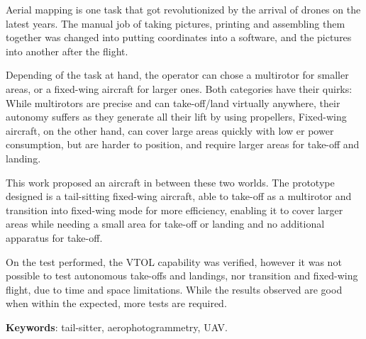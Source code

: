 \begin{resumo}[Abstract]

Aerial mapping is one task that got revolutionized by the arrival of drones on the latest years. The manual job of taking pictures, printing and assembling them together was changed into putting coordinates into a software, and the pictures into another after the flight.

Depending of the task at hand, the operator can chose a multirotor for smaller areas, or a fixed-wing aircraft for larger ones. Both categories have their quirks: While multirotors are precise and can take-off/land virtually anywhere, their autonomy suffers as they generate all their lift by using propellers, Fixed-wing aircraft, on the other hand, can cover large areas quickly with low	er power consumption, but are harder to position, and require larger areas for take-off and landing.
 
This work proposed an aircraft in between these two worlds. The prototype designed is a tail-sitting fixed-wing aircraft, able to take-off as a multirotor and transition into fixed-wing mode for more efficiency, enabling it to cover larger areas while needing a small area for take-off or landing and no additional apparatus for take-off.	

On the test performed, the VTOL capability was verified, however it was not possible to test autonomous take-offs and landings, nor transition and fixed-wing flight, due to time and space limitations. While the results observed are good when within the expected, more tests are required. 

   \vspace{\onelineskip}
 
   \noindent 
   \textbf{Keywords}: tail-sitter, aerophotogrammetry, UAV.

\end{resumo}
